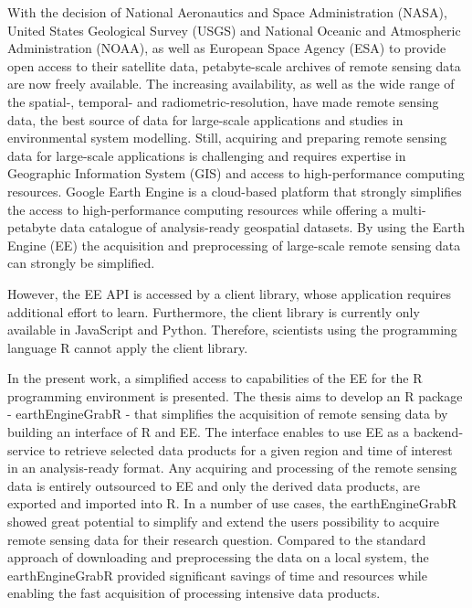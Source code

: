 
With the decision of National Aeronautics and Space Administration (NASA), United States Geological Survey (USGS) and National Oceanic and Atmospheric Administration (NOAA), as well as European Space Agency (ESA) to provide open access to their satellite data, petabyte-scale archives of remote sensing data are now freely available.
The increasing availability, as well as the wide range of the spatial-, temporal-  and radiometric-resolution, have made remote sensing data, the best source of data for large-scale applications and studies in environmental system modelling.
Still, acquiring and preparing remote sensing data for large-scale applications is challenging and requires expertise in Geographic Information System (GIS) and access to high-performance computing resources.
Google Earth Engine is a cloud-based platform that strongly simplifies the access to high-performance computing resources while offering a multi-petabyte data catalogue of analysis-ready geospatial datasets.
By using the Earth Engine (EE) the acquisition and preprocessing of large-scale remote sensing data can strongly be simplified.

However, the EE API is accessed by a client library, whose application requires additional effort to learn. Furthermore, the client library is currently only available in JavaScript and Python. Therefore, scientists using the programming language R cannot apply the client library.

In the present work, a simplified access to capabilities of the EE for the R programming environment is presented.
The thesis aims to develop an R package - earthEngineGrabR - that simplifies the acquisition of remote sensing data by building an interface of R and EE. The interface enables to use EE as a backend-service to retrieve selected data products for a given region and time of interest in an analysis-ready format. Any acquiring and processing of the remote sensing data is entirely outsourced to EE and only the derived data products, are exported and imported into R. In a number of use cases, the earthEngineGrabR showed great potential to simplify and extend the users possibility to acquire remote sensing data for their research question. Compared to the standard approach of downloading and preprocessing the data on a local system, the earthEngineGrabR provided significant savings of time and resources while enabling the fast acquisition of processing intensive data products.


 
